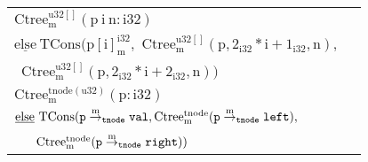 \begin{table}[H]
\begin{scriptsize}
\begin{center}
\begin{tabular}{|l|l|}
\hline
$\mathrm{Ctree^{u32[]}_m(p\ i\ n : i32)}$ & \makecell[l]{\Tstrut $\mathrm{\underline{if}\ (i \geq_{u} n)}$ $\mathrm{\underline{then}\ TNil}$ \\ \Bstrut $\mathrm{\underline{else}\ TCons(p[i]^{i32}_m,}$ $\mathrm{Ctree^{u32[]}_m(p,2_{i32}*i+1_{i32},n),}$ \\ \qquad\qquad\qquad\qquad\ $\mathrm{Ctree^{u32[]}_m(p,2_{i32}*i+2_{i32},n))}$ } \\
\hline
$\mathrm{Ctree^{tnode(u32)}_m(p:i32)}$ & \makecell[l]{\Tstrut $\mathrm{\underline{if}\ (p==0_{i32})}$ $\mathrm{\underline{then}\ TNil}$ \\ \Bstrut $\mathrm{\underline{else}\ TCons({\tt \tt p} \overset{m}{\rightarrow}_{\tt tnode} {\tt val}, Ctree^{tnode}_m({\tt \tt p} \overset{m}{\rightarrow}_{\tt tnode} {\tt left}),}$ \\ \qquad\qquad\qquad\qquad\qquad\ \ \ $\mathrm{Ctree^{tnode}_m({\tt \tt p} \overset{m}{\rightarrow}_{\tt tnode} {\tt right}))}$ } \\
\hline

\end{tabular}
\end{center}
\end{scriptsize}
\end{table}

